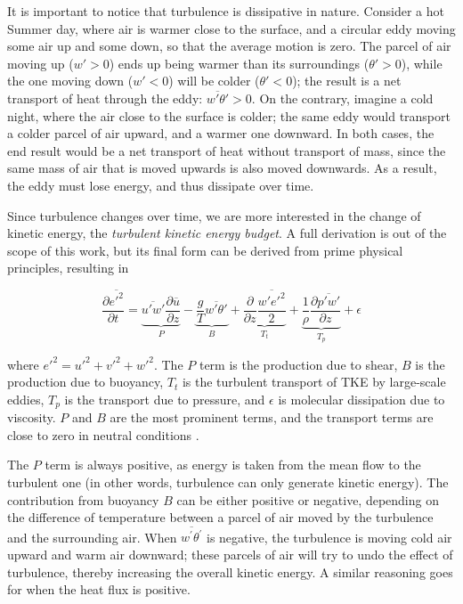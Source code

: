 \documentclass[a4paper,11pt]{kth-mag}
\begin{document}
It is important to notice that turbulence is dissipative in nature. Consider a hot Summer day, where air is warmer close to the surface, and a circular eddy moving some air up and some down, so that the average motion is zero. The parcel of air moving up ($w'>0$) ends up being warmer than its surroundings ($\theta'>0$), while the one moving down ($w'<0$) will be colder ($\theta'<0$); the result is a net transport of heat through the eddy: $\overline{w'\theta'}>0$. On the contrary, imagine a cold night, where the air close to the surface is colder; the same eddy would transport a colder parcel of air upward, and a warmer one downward. In both cases, the end result would be a net transport of heat without transport of mass, since the same mass of air that is moved upwards is also moved downwards. As a result, the eddy must lose energy, and thus dissipate over time.

Since turbulence changes over time, we are more interested in the change of kinetic energy, the \emph{turbulent kinetic energy budget}. A full derivation is out of the scope of this work, but its final form \citep{basicatm} can be derived from prime physical principles, resulting in

\begin{equation}
\frac{\partial\overline{{e'}^2}}{\partial t}
=\underbrace{\overline{u'w'}\frac{\partial\overline{u}}{\partial z}}_P
-\underbrace{\frac{g}{T}\overline{w'\theta'}}_B
+\underbrace{\frac{\partial}{\partial z}\frac{\overline{w'{e'}^2}}{2}}_{T_t}
+\underbrace{\frac{1}{\rho}\frac{\partial\overline{p'w'}}{\partial z}}_{T_p}
+\epsilon
\end{equation}

\noindent where ${e'}^2={u'}^2+{v'}^2+{w'}^2$. The $P$ term is the production due to shear, $B$ is the production due to buoyancy, $T_t$ is the turbulent transport of TKE by large-scale eddies, $T_p$ is the transport due to pressure, and $\epsilon$ is molecular dissipation due to viscosity. $P$ and $B$ are the most prominent terms, and the transport terms are close to zero in neutral conditions \citep{basicatm}.

The $P$ term is always positive, as energy is taken from the mean flow to the turbulent one (in other words, turbulence can only generate kinetic energy). The contribution from buoyancy $B$ can be either positive or negative, depending on the difference of temperature between a parcel of air moved by the turbulence and the surrounding air. When $\overline{w^\prime\theta^\prime}$ is negative, the turbulence is moving cold air upward and warm air downward; these parcels of air will try to undo the effect of turbulence, thereby increasing the overall kinetic energy. A similar reasoning goes for when the heat flux is positive.
\end{document}
